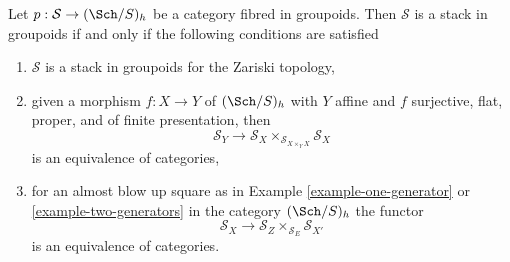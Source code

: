 \begin{lemma}
\label{lemma-refine-check-h-stack}
Let $p : \mathcal{S} \to (\Sch/S)_h$ be a category fibred in groupoids.
Then $\mathcal{S}$ is a stack in groupoids if and only if the following
conditions are satisfied
\begin{enumerate}
\item $\mathcal{S}$ is a stack in groupoids for the Zariski topology,
\item given a morphism $f : X \to Y$ of $(\Sch/S)_h$ with $Y$ affine
and $f$ surjective, flat, proper, and of finite presentation, then
$$
\mathcal{S}_Y \longrightarrow
\mathcal{S}_X \times_{\mathcal{S}_{X \times_Y X}} \mathcal{S}_X
$$
is an equivalence of categories,
\item for an almost blow up square as in
Example \ref{example-one-generator} or \ref{example-two-generators}
in the category $(\Sch/S)_h$ the functor
$$
\mathcal{S}_X \longrightarrow
\mathcal{S}_Z \times_{\mathcal{S}_E} \mathcal{S}_{X'}
$$
is an equivalence of categories.
\end{enumerate}
\end{lemma}

